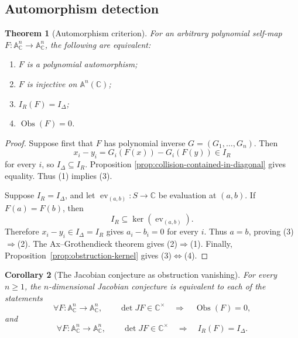 \documentclass[11pt]{article}
\newtheorem{theorem}{Theorem}[section]
\newtheorem{corollary}[theorem]{Corollary}
\theoremstyle{remark}
\theoremstyle{definition}
\newcommand{\A}{\mathbb A}
\newcommand{\C}{\mathbb C}
\newcommand{\Obs}{\operatorname{Obs}}
\begin{document}
\subsection{Automorphism detection}
\label{sec:automorphism-detection}

\begin{theorem}[Automorphism criterion]
\label{thm:automorphism-criterion}
For an arbitrary polynomial self-map
\(F\colon\A^n_{\C}\to\A^n_{\C}\), the following are equivalent:
\begin{enumerate}[label=\textup{(\arabic*)}]
  \item \(F\) is a polynomial automorphism;
  \item \(F\) is injective on \(\A^n(\C)\);
  \item \(I_R(F)=I_\Delta\);
  \item \(\Obs(F)=0\).
\end{enumerate}
\end{theorem}

\begin{proof}
Suppose first that \(F\) has polynomial inverse
\(G=(G_1,\dots,G_n)\).  Then
\[
  x_i-y_i
  =
  G_i(F(x))-G_i(F(y))
  \in I_R
\]
for every \(i\), so \(I_\Delta\subseteq I_R\).  Proposition
\ref{prop:collision-contained-in-diagonal} gives equality.  Thus
\textup{(1)} implies \textup{(3)}.

Suppose \(I_R=I_\Delta\), and let
\(\operatorname{ev}_{(a,b)}\colon S\to\C\) be evaluation at
\((a,b)\).  If \(F(a)=F(b)\), then
\[
  I_R\subseteq\ker(\operatorname{ev}_{(a,b)}).
\]
Therefore \(x_i-y_i\in I_\Delta=I_R\) gives \(a_i-b_i=0\) for every
\(i\).  Thus \(a=b\), proving
\textup{(3)}\(\Rightarrow\)\textup{(2)}.  The
Ax--Grothendieck theorem \cite{Ax1969} gives
\textup{(2)}\(\Rightarrow\)\textup{(1)}.  Finally,
Proposition~\ref{prop:obstruction-kernel} gives
\textup{(3)}\(\Longleftrightarrow\)\textup{(4)}.
\end{proof}

\begin{corollary}[The Jacobian conjecture as obstruction vanishing]
\label{cor:jacobian-conjecture-as-vanishing}
For every \(n\geq1\), the \(n\)-dimensional Jacobian conjecture is
equivalent to each of the statements
\[
  \forall F\colon\A^n_{\C}\to\A^n_{\C},
  \qquad
  \det JF\in\C^\times
  \quad\Longrightarrow\quad
  \Obs(F)=0,
\]
and
\[
  \forall F\colon\A^n_{\C}\to\A^n_{\C},
  \qquad
  \det JF\in\C^\times
  \quad\Longrightarrow\quad
  I_R(F)=I_\Delta.
\]
\end{corollary}
\end{document}
